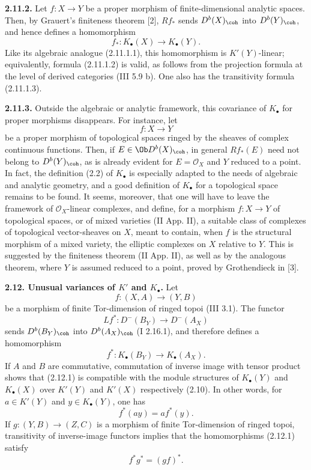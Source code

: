 \documentclass[11pt]{article}
\begin{document}
\textbf{2.11.2.} Let \(f:X\to Y\) be a proper morphism of finite-dimensional analytic spaces. Then, by Grauert's finiteness theorem [2], \(Rf_*\) sends \(D^b(X)_{\coh}\) into \(D^b(Y)_{\coh}\), and hence defines a homomorphism
\begin{equation}\tag{2.11.2.1}
 f_*:K_{\bullet}(X)\longrightarrow K_{\bullet}(Y).
\end{equation}
Like its algebraic analogue (2.11.1.1), this homomorphism is \(K'(Y)\)-linear; equivalently, formula (2.11.1.2) is valid, as follows from the projection formula at the level of derived categories (III 5.9 b). One also has the transitivity formula (2.11.1.3).

\textbf{2.11.3.} Outside the algebraic or analytic framework, this covariance of \(K_{\bullet}\) for proper morphisms disappears. For instance, let
\[
 f:X\to Y
\]
be a proper morphism of topological spaces ringed by the sheaves of complex continuous functions. Then, if \(E\in\Ob D^b(X)_{\coh}\), in general \(Rf_*(E)\) need not belong to \(D^b(Y)_{\coh}\), as is already evident for \(E=\mathcal O_X\) and \(Y\) reduced to a point. In fact, the definition (2.2) of \(K_{\bullet}\) is especially adapted to the needs of algebraic and analytic geometry, and a good definition of \(K_{\bullet}\) for a topological space remains to be found. It seems, moreover, that one will have to leave the framework of \(\mathcal O_X\)-linear complexes, and define, for a morphism \(f:X\to Y\) of topological spaces, or of mixed varieties (II App. II), a suitable class of complexes of topological vector-sheaves on \(X\), meant to contain, when \(f\) is the structural morphism of a mixed variety, the elliptic complexes on \(X\) relative to \(Y\). This is suggested by the finiteness theorem (II App. II), as well as by the analogous theorem, where \(Y\) is assumed reduced to a point, proved by Grothendieck in [3].

\textbf{2.12. Unusual variances of \(K'\) and \(K_{\bullet}\).} Let
\[
 f:(X,A)\longrightarrow(Y,B)
\]
be a morphism of finite Tor-dimension of ringed topoi (III 3.1). The functor
\[
 Lf^*:D^-(B_Y)\longrightarrow D^-(A_X)
\]
sends \(D^b(B_Y)_{\coh}\) into \(D^b(A_X)_{\coh}\) (I 2.16.1), and therefore defines a homomorphism
\begin{equation}\tag{2.12.1}
 f^*:K_{\bullet}(B_Y)\longrightarrow K_{\bullet}(A_X).
\end{equation}
If \(A\) and \(B\) are commutative, commutation of inverse image with tensor product shows that (2.12.1) is compatible with the module structures of \(K_{\bullet}(Y)\) and \(K_{\bullet}(X)\) over \(K'(Y)\) and \(K'(X)\) respectively (2.10). In other words, for \(a\in K'(Y)\) and \(y\in K_{\bullet}(Y)\), one has
\begin{equation}\tag{2.12.2}
 f^*(ay)=a f^*(y).
\end{equation}
If \(g:(Y,B)\to(Z,C)\) is a morphism of finite Tor-dimension of ringed topoi, transitivity of inverse-image functors implies that the homomorphisms (2.12.1) satisfy
\begin{equation}\tag{2.12.1.1}
 f^*g^*=(gf)^*.
\end{equation}
\end{document}
